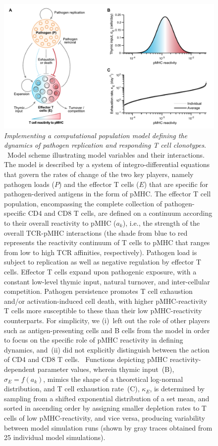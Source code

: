 \begin{figure}[htb!]
    \centering
    \includegraphics[width=\textwidth]{Figures/AvC/fig1_scheme.pdf}
    \caption[Implementing a computational population model defining the dynamics of pathogen replication and responding T cell clonotypes]{\textit{Implementing a computational population model defining the dynamics of pathogen replication and responding T cell clonotypes}. %
    ~Model scheme illustrating model variables and their interactions. The model is described by a system of integro-differential equations that govern the rates of change of the two key players, namely pathogen loads ($P$) and the effector T cells ($E$) that are specific for pathogen-derived antigens in the form of pMHC. The effector T cell population, encompassing the complete collection of pathogen-specific CD4\pos{} and CD8\pos{} T cells, are defined on a continuum according to their overall reactivity to pMHC ($a_k$), i.e., the strength of the overall TCR-pMHC interactions (the shade from blue to red represents the reactivity continuum of T cells to pMHC that ranges from low to high TCR affinities, respectively). Pathogen load is subject to replication as well as negative regulation by effector T cells. Effector T cells expand upon pathogenic exposure, with a constant low-level thymic input, natural turnover, and inter-cellular competition. Pathogen persistence promotes T cell exhaustion and/or activation-induced cell death, with higher pMHC-reactivity T cells more susceptible to these than their low pMHC-reactivity counterparts. For simplicity, we (i)~left out the role of other players such as antigen-presenting cells and B cells from the model in order to focus on the specific role of pMHC reactivity in defining dynamics, and~(ii) did not explicitly distinguish between the action of CD4\pos{} and CD8\pos{} T cells. %
    ~Functions depicting pMHC reactivity-dependent parameter values, wherein thymic input~(B), $\sigma_E=f(a_k)$, mimics the shape of a theoretical log-normal distribution, and T cell exhaustion rate~(C), $\kappa_E$, is determined by sampling from a shifted exponential distribution of a set mean, and sorted in ascending order by assigning smaller depletion rates to T cells of low pMHC-reactivity, and vice versa, producing variability between model simulation runs (shown by gray traces obtained from 25 individual model simulations).}
    \label{fig:AvC_scheme}
\end{figure}

